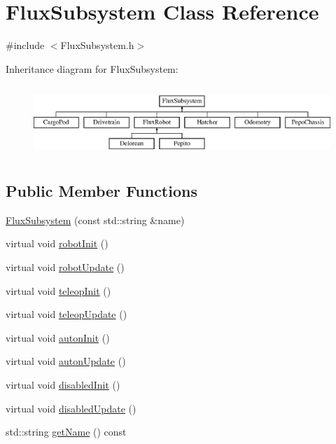 \hypertarget{classFluxSubsystem}{}\section{Flux\+Subsystem Class Reference}
\label{classFluxSubsystem}


{\ttfamily \#include $<$Flux\+Subsystem.\+h$>$}

Inheritance diagram for Flux\+Subsystem\+:\begin{figure}[H]
\begin{center}
\leavevmode
\includegraphics[height=2.692308cm]{classFluxSubsystem}
\end{center}
\end{figure}
\subsection*{Public Member Functions}
\begin{DoxyCompactItemize}
\item 
\hyperlink{classFluxSubsystem_ae1c7aa86576c8b74db9283df11f556d0}{Flux\+Subsystem} (const std\+::string \&name)
\item 
virtual void \hyperlink{classFluxSubsystem_aacd5ddfcadda0866d5e838de09a60d63}{robot\+Init} ()
\item 
virtual void \hyperlink{classFluxSubsystem_ac2b1c08b53251870e945edf7080c1549}{robot\+Update} ()
\item 
virtual void \hyperlink{classFluxSubsystem_aec6d05e4f80c3783684598fb92ad2e55}{teleop\+Init} ()
\item 
virtual void \hyperlink{classFluxSubsystem_a327d76affc60699bfa62563e364e42f5}{teleop\+Update} ()
\item 
virtual void \hyperlink{classFluxSubsystem_a142cb34f612412e26bd0049e037dbe60}{auton\+Init} ()
\item 
virtual void \hyperlink{classFluxSubsystem_aceed900af22503022b8d1278f3693f77}{auton\+Update} ()
\item 
virtual void \hyperlink{classFluxSubsystem_aa0b8fde8aa5094627d15d24e545e1da4}{disabled\+Init} ()
\item 
virtual void \hyperlink{classFluxSubsystem_a5c39cb0f0834cc77a2b8f4f47778da87}{disabled\+Update} ()
\item 
std\+::string \hyperlink{classFluxSubsystem_a661009e388711cd134d519160d1633ac}{get\+Name} () const
\end{DoxyCompactItemize}


